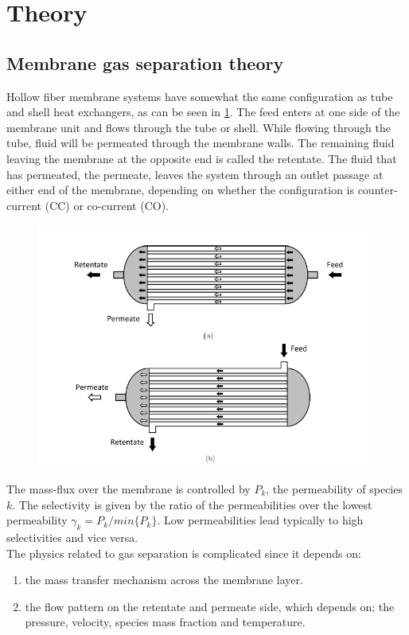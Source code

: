 \section{Theory}
\subsection{Membrane gas separation theory}
Hollow fiber membrane systems have somewhat the same configuration as tube and shell heat exchangers, as can be seen in \ref{fig:fig4}. The feed enters at one side of the membrane unit and flows through the tube or shell. While flowing through the tube, fluid will be permeated through the membrane walls. The remaining fluid leaving the membrane at the opposite end is called the retentate. The fluid that has permeated, the permeate, leaves the system through an outlet passage at either end of the membrane, depending on whether the configuration is counter-current (CC) or co-current (CO). 

\begin{figure}[H]
		\centering
	\includegraphics[width= 1\textwidth]{Images/fig7.png}
	\label{fig:fig4}
\end{figure}
The mass-flux over the membrane is controlled by $P_k$, the permeability of species $k$. The selectivity is given by the ratio of the permeabilities over the lowest permeability $\gamma_k = P_k/min\{P_k\}$. Low permeabilities lead typically to high selectivities and vice versa. \\
The physics related to gas separation is complicated since it depends on:
\begin{enumerate}
	\item the mass transfer mechanism across the membrane layer.
	\item  the flow pattern on the retentate and permeate side, which depends on; the pressure, velocity, species mass fraction and temperature. 
\end{enumerate}

